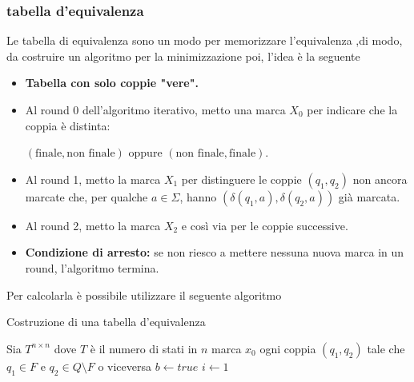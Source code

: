 \subsubsection{tabella d'equivalenza}

Le tabella di equivalenza sono un modo per memorizzare l'equivalenza ,di modo, da costruire un algoritmo per la minimizzazione poi, l'idea è la seguente 

\begin{itemize}
    \item \textbf{Tabella con solo coppie "vere".}
    \item Al round 0 dell'algoritmo iterativo, metto una marca \( X_0 \) per indicare che la coppia è distinta:

          \((\text{finale}, \text{non finale})\) oppure \((\text{non finale}, \text{finale})\).
    \item Al round 1, metto la marca \( X_1 \) per distinguere le coppie \((q_1, q_2)\) non ancora marcate che, per qualche \( a \in \Sigma \), 
          hanno \((\delta(q_1, a), \delta(q_2, a))\) già marcata.
    \item Al round 2, metto la marca \( X_2 \) e così via per le coppie successive.
    \item \textbf{Condizione di arresto:} se non riesco a mettere nessuna nuova marca in un round, l'algoritmo termina.
\end{itemize}

Per calcolarla è possibile utilizzare il seguente algoritmo
\begin{algorithm}
    \caption{Costruzione di una tabella d'equivalenza}

    Sia $T^{n\times n}$ dove $T$ è il numero di stati in $n$\;
    marca $x_0$ ogni coppia $(q_1, q_2)$ tale che $q_1\in F$ e $q_2\in Q\setminus F$ o viceversa\;
    $b \gets true$\;
    $i\gets 1$\;
\end{algorithm}

